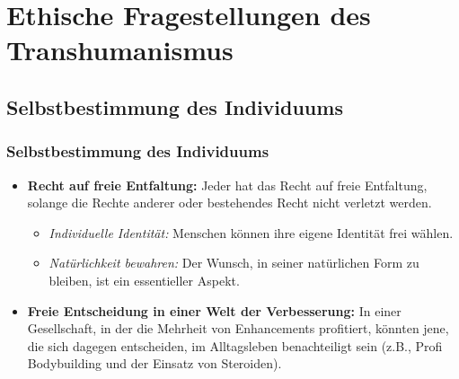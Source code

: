 \documentclass[aspectratio=169,16pt,xcolor=table]{beamer}
\begin{document}
\section{Ethische Fragestellungen des Transhumanismus}
\subsection{Selbstbestimmung des Individuums}
\begin{frame}
  \frametitle{Selbstbestimmung des Individuums}
  \begin{itemize}
    \item \textbf{Recht auf freie Entfaltung:} Jeder hat das Recht auf freie Entfaltung, solange die Rechte anderer oder bestehendes Recht nicht verletzt werden\cite{fur1996grundgesetz}.
    \begin{itemize}
      \item \textit{Individuelle Identität:} Menschen können ihre eigene Identität frei wählen.
      \item \textit{Natürlichkeit bewahren:} Der Wunsch, in seiner natürlichen Form zu bleiben, ist ein essentieller Aspekt.
    \end{itemize}
    \item \textbf{Freie Entscheidung in einer Welt der Verbesserung:} In einer Gesellschaft, in der die Mehrheit von Enhancements profitiert, könnten jene, die sich dagegen entscheiden, im Alltagsleben benachteiligt sein (z.B., Profi Bodybuilding und der Einsatz von Steroiden).
  \end{itemize}
\end{frame}
\end{document}
